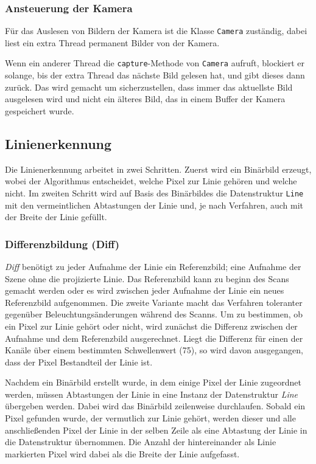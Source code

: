 \documentclass[ngerman,a4paper,parskip=half]{scrartcl}
\begin{document}
\subsubsection{Ansteuerung der Kamera}

Für das Auslesen von Bildern der Kamera ist die Klasse \texttt{Camera} zuständig, dabei liest ein extra Thread permanent Bilder von der Kamera.

Wenn ein anderer Thread die \texttt{capture}-Methode von \texttt{Camera} aufruft, blockiert er solange, bis der extra Thread das nächste Bild gelesen hat, und gibt dieses dann zurück. Das wird gemacht um sicherzustellen, dass immer das aktuellste Bild ausgelesen wird und nicht ein älteres Bild, das in einem Buffer der Kamera gespeichert wurde.


\subsection{Linienerkennung}

Die Linienerkennung arbeitet in zwei Schritten. Zuerst wird ein Binärbild erzeugt, wobei der Algorithmus entscheidet, welche Pixel zur Linie gehören und welche nicht. Im zweiten Schritt wird auf Basis des Binärbildes die Datenstruktur \texttt{Line} mit den vermeintlichen Abtastungen der Linie und, je nach Verfahren, auch mit der Breite der Linie gefüllt.

\subsubsection{Differenzbildung (Diff)}

\emph{Diff} benötigt zu jeder Aufnahme der Linie ein Referenzbild; eine Aufnahme der Szene ohne die projizierte Linie. Das Referenzbild kann zu beginn des Scans gemacht werden oder es wird zwischen jeder Aufnahme der Linie ein neues Referenzbild aufgenommen. Die zweite Variante macht das Verfahren toleranter gegenüber Beleuchtungsänderungen während des Scanns.
Um zu bestimmen, ob ein Pixel zur Linie gehört oder nicht, wird zunächst die Differenz zwischen der Aufnahme und dem Referenzbild ausgerechnet. Liegt die Differenz für einen der Kanäle über einem bestimmten Schwellenwert (75), so wird davon ausgegangen, dass der Pixel Bestandteil der Linie ist.

Nachdem ein Binärbild erstellt wurde, in dem einige Pixel der Linie zugeordnet werden, müssen Abtastungen der Linie in eine Instanz der Datenstruktur \emph{Line} übergeben werden. Dabei wird das Binärbild zeilenweise durchlaufen. Sobald ein Pixel gefunden wurde, der vermutlich zur Linie gehört, werden dieser und alle anschließenden Pixel der Linie in der selben Zeile als eine Abtastung der Linie in die Datenstruktur übernommen. Die Anzahl der hintereinander als Linie markierten Pixel wird dabei als die Breite der Linie aufgefasst.
\end{document}
